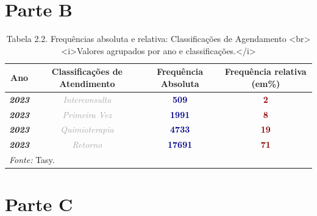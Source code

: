 \documentclass[
  letterpaper,
  DIV=11,
  numbers=noendperiod]{scrreprt}
\begin{document}
\section{Parte B}

\begin{table}
\centering
\caption{Tabela 2.2. Frequências absoluta e relativa: Classificações de Agendamento  <br><i>Valores agrupados por ano e classificações.</i>}
\centering
\begin{tabular}[t]{>{}c|>{}c|>{}c|>{}c}
\hline
Ano & Classificações de Atendimento & Frequência Absoluta & Frequência relativa (em\%)\\
\hline
\textcolor{black}{\em{\textbf{2023}}} & \textcolor{darkgray}{\em{Interconsulta}} & \textcolor{darkblue}{\textbf{509}} & \textcolor{darkred}{\textbf{2}}\\
\hline
\textcolor{black}{\em{\textbf{2023}}} & \textcolor{darkgray}{\em{Primeira Vez}} & \textcolor{darkblue}{\textbf{1991}} & \textcolor{darkred}{\textbf{8}}\\
\hline
\textcolor{black}{\em{\textbf{2023}}} & \textcolor{darkgray}{\em{Quimioterapia}} & \textcolor{darkblue}{\textbf{4733}} & \textcolor{darkred}{\textbf{19}}\\
\hline
\textcolor{black}{\em{\textbf{2023}}} & \textcolor{darkgray}{\em{Retorno}} & \textcolor{darkblue}{\textbf{17691}} & \textcolor{darkred}{\textbf{71}}\\
\hline
\multicolumn{4}{l}{\rule{0pt}{1em}\textit{Fonte: } Tasy.}\\
\end{tabular}
\end{table}

\section{Parte C}
\end{document}
